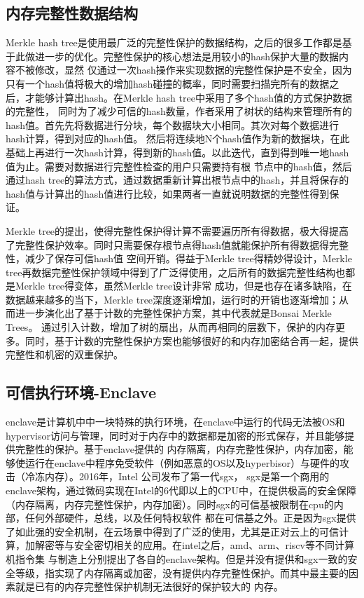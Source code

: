 \subsection{内存完整性数据结构}
Merkle hash tree是使用最广泛的完整性保护的数据结构，之后的很多工作都是基于此做进一步的优化。完整性保护的核心想法是用较小的hash保护大量的数据内容不被修改，显然
仅通过一次hash操作来实现数据的完整性保护是不安全，因为只有一个hash值将极大的增加hash碰撞的概率，同时需要扫描完所有的数据之后，才能够计算出hash。在Merkle hash tree中采用了多个hash值的方式保护数据的完整性，
同时为了减少可信的hash数量，作者采用了树状的结构来管理所有的hash值。首先先将数据进行分块，每个数据块大小相同。其次对每个数据进行hash计算，得到对应的hash值。
然后将连续地N个hash值作为新的数据块，在此基础上再进行一次hash计算，得到新的hash值。以此迭代，直到得到唯一地hash值为止。需要对数据进行完整性检查的用户只需要持有根
节点中的hash值，然后通过hash tree的算法方式，通过数据重新计算出根节点中的hash，并且将保存的hash值与计算出的hash值进行比较，如果两者一直就说明数据的完整性得到保证。

Merkle tree的提出，使得完整性保护得计算不需要遍历所有得数据，极大得提高了完整性保护效率。同时只需要保存根节点得hash值就能保护所有得数据得完整性，减少了保存可信hash值
空间开销。得益于Merkle tree得精妙得设计，Merkle tree再数据完整性保护领域中得到了广泛得使用，之后所有的数据完整性结构也都是Merkle tree得变体，虽然Merkle tree设计非常
成功，但是也存在诸多缺陷，在数据越来越多的当下，Merkle tree深度逐渐增加，运行时的开销也逐渐增加；从而进一步演化出了基于计数的完整性保护方案，其中代表就是Bonsai Merkle Trees。
通过引入计数，增加了树的扇出，从而再相同的层数下，保护的内存更多。同时，基于计数的完整性保护方案也能够很好的和内存加密结合再一起，提供完整性和机密的双重保护。

\subsection{可信执行环境-Enclave}
enclave是计算机中中一块特殊的执行环境，在enclave中运行的代码无法被OS和hypervisor访问与管理，同时对于内存中的数据都是加密的形式保存，并且能够提供完整性的保护。基于enclave提供的
内存隔离，内存完整性保护，内存加密，能够使运行在enclave中程序免受软件（例如恶意的OS以及hyperbisor）与硬件的攻击（冷冻内存）。2016年，Intel 公司发布了第一代sgx， sgx是第一个商用的
enclave架构，通过微码实现在Intel的6代即以上的CPU中，在提供极高的安全保障（内存隔离，内存完整性保护，内存加密）。同时sgx的可信基被限制在cpu的内部，任何外部硬件，总线，以及任何特权软件
都在可信基之外。正是因为sgx提供了如此强的安全机制，在云场景中得到了广泛的使用，尤其是正对云上的可信计算，加解密等与安全密切相关的应用。在intel之后，amd、arm、riscv等不同计算机指令集
与制造上分别提出了各自的enclave架构。但是并没有提供和sgx一致的安全等级，指实现了内存隔离或加密，没有提供内存完整性保护。而其中最主要的因素就是已有的内存完整性保护机制无法很好的保护较大的
内存。

